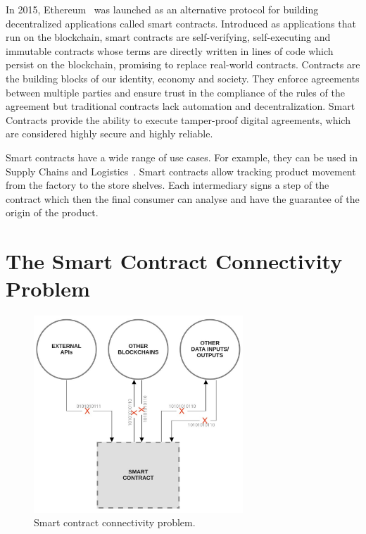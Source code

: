 In 2015, Ethereum~\citet{GavinWood2014} was launched as an alternative protocol for building decentralized applications called smart contracts. Introduced as applications that run on the blockchain, smart contracts are self-verifying, self-executing and immutable contracts whose terms are directly written in lines of code which persist on the blockchain, promising to replace real-world contracts. Contracts are the building blocks of our identity, economy and society. They enforce agreements between multiple parties and ensure trust in the compliance of the rules of the agreement but traditional contracts lack automation and decentralization. Smart Contracts provide the ability to execute tamper-proof digital agreements, which are considered highly secure and highly reliable.

Smart contracts have a wide range of use cases. For example, they can be used in Supply Chains and Logistics~\citet{Korpela2017}. Smart contracts allow tracking product movement from the factory to the store shelves. Each intermediary signs a step of the contract which then the final consumer can analyse and have the guarantee of the origin of the product.


\section{The Smart Contract Connectivity Problem}

\begin{figure}[H]
  \begin{center}
    \leavevmode
    \includegraphics[width=0.7\textwidth]{figures/sc_connectivity.jpg}
    \caption{Smart contract connectivity problem.}
    \label{fig:/figures/sc_connectivity.jpg}
  \end{center}
\end{figure}

